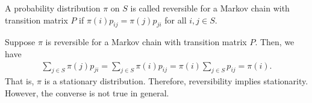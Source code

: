 \begin{definition}
    A probability distribution $\pi$ on $S$ is called reversible for a Markov chain with transition matrix $P$ if $\pi(i)p_{ij} = \pi(j)p_{ji}$ for all $i,j \in S$.
\end{definition}
Suppose $\pi$ is reversible for a Markov chain with transition matrix $P$. Then, we have
\begin{align}
    \sum_{j \in S} \pi(j) p_{ji} = \sum_{j \in S} \pi(i)p_{ij} = \pi(i) \sum_{j \in S} p_{ij} = \pi(i).
\end{align}
That is, $\pi$ is a stationary distribution. Therefore, reversibility implies stationarity. However, the converse is not true in general. 